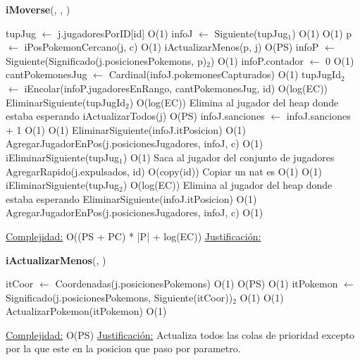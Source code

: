 \begin{algorithm}[H]{\textbf{iMoverse}(, , )}{}
	\begin{algorithmic}
	\State tupJug $\gets$ j.jugadoresPorID[id]	\Comment O(1)
	\State infoJ $\gets$ Siguiente(tupJug$_{1}$)	\Comment O(1)
		\Comment O(1)
		\State p $\gets$ iPosPokemonCercano(j, c)	\Comment O(1)
		\State iActualizarMenos(p, j)	\Comment O(PS)
		\State infoP $\gets$ Siguiente(Significado(j.posicionesPokemons, p)$_{2}$)	\Comment O(1)
		\State infoP.contador $\gets$ 0 \Comment O(1)
		\State cantPokemonesJug $\gets$ Cardinal(infoJ.pokemonesCapturados)	\Comment O(1)
		\State tupJugId$_{2}$ $\gets$ iEncolar(infoP.jugadoresEnRango, cantPokemonesJug, id)	\Comment O(log(EC))
	\Else
			\State EliminarSiguiente(tupJugId$_{2}$)	\Comment O(log(EC)) {Elimina al jugador del heap donde estaba esperando}
		\EndIf
		\State iActualizarTodos(j)	\Comment O(PS)
	\EndIf
  \State infoJ.sanciones $\gets$ infoJ.sanciones + 1	\Comment O(1)
			\Comment O(1)
			\State EliminarSiguiente(infoJ.itPosicion) \Comment O(1)
			\State AgregarJugadorEnPos(j.posicionesJugadores, infoJ, c) \Comment O(1)
		\Else
			\State iEliminarSiguiente(tupJug$_{1}$)	\Comment O(1) {Saca al jugador del conjunto de jugadores}
			\State AgregarRapido(j.expulsados, id)	\Comment O(copy(id)) {Copiar un nat es O(1)}
				\Comment O(1)
				\State iEliminarSiguiente(tupJug$_{2}$)	\Comment O(log(EC)) {Elimina al jugador del heap donde estaba esperando}
			\EndIf
		\EndIf
	\Else
		\State EliminarSiguiente(infoJ.itPosicion) \Comment O(1)
		\State AgregarJugadorEnPos(j.posicionesJugadores, infoJ, c) \Comment O(1)
	\EndIf

\medskip
\Statex \underline{Complejidad:} O((PS + PC) * |P| + log(EC))
\Statex \underline{Justificación:}
\end{algorithmic}
\end{algorithm}

\begin{algorithm}[H]{\textbf{iActualizarMenos}(, )} 
	\begin{algorithmic}
		\State itCoor $\gets$ Coordenadas(j.posicionesPokemons)	\Comment O(1)
			\Comment O(PS)
				\Comment O(1)
				\State itPokemon $\gets$ Significado(j.posicionesPokemons, Siguiente(itCoor))$_{2}$	\Comment O(1)
					\Comment O(1)
					\State ActualizarPokemon(itPokemon)	\Comment O(1)
				\EndIf
			\EndIf
		\EndWhile

	
		\medskip
		\Statex \underline{Complejidad:} O(PS)
		\Statex \underline{Justificación:} Actualiza todos las colas de prioridad excepto por la que este en la posicion que paso por parametro.
    \end{algorithmic}
\end{algorithm}

